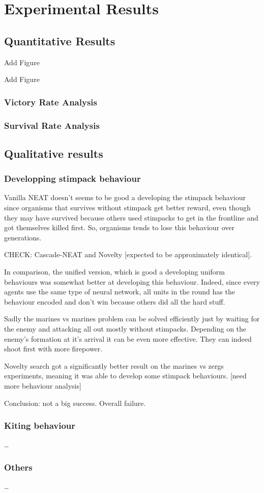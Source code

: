 \section{Experimental Results}\label{section:experiments-results}

\subsection{Quantitative Results}

Add Figure

Add Figure

\subsubsection{Victory Rate Analysis}

\subsubsection{Survival Rate Analysis}

\subsection{Qualitative results}

\subsubsection{Developping stimpack behaviour}

Vanilla NEAT doesn’t seems to be good a developing the stimpack behaviour since organisms
that survives without stimpack get better reward,
even though they may have survived because others used stimpacks to get in the frontline
and got themselves killed first.
So, organisms tends to lose this behaviour over generations.

CHECK: Cascade-NEAT and Novelty [expected to be approximately identical].

In comparison, the unified version, which is good a developing uniform behaviours
was somewhat better at developing this behaviour.
Indeed, since every agents use the same type of neural network, all units in the round
has the behaviour encoded and don’t win because others
did all the hard stuff.

Sadly the marines vs marines problem can be solved efficiently just by waiting for the
enemy and attacking all out mostly without stimpacks.
Depending on the enemy’s formation at it’s arrival it can be even more effective.
They can indeed shoot first with more firepower.

Novelty search got a significantly better result on the marines vs zergs experiments,
meaning it was able to develop some stimpack behaviours. [need more behaviour analysis]

Conclusion: not a big success. Overall failure.

\subsubsection{Kiting behaviour}

…


\subsubsection{Others}

…




